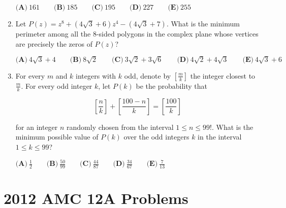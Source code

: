 \documentclass{article}
\begin{document}
\begin{enumerate}[label=\arabic*., itemsep=0.5em]
\(\textbf{(A)}\ 161 \qquad \textbf{(B)}\ 185 \qquad \textbf{(C)}\  195 \qquad \textbf{(D)}\  227 \qquad \textbf{(E)}\  255\)\par \vspace{0.5em}\item Let \(P(z) = z^8 + \left(4\sqrt{3} + 6\right)z^4 - \left(4\sqrt{3} + 7\right)\). What is the minimum perimeter among all the \(8\)-sided polygons in the complex plane whose vertices are precisely the zeros of \(P(z)\)?

\(\textbf{(A)}\ 4\sqrt{3} + 4 \qquad \textbf{(B)}\ 8\sqrt{2} \qquad \textbf{(C)}\  3\sqrt{2} + 3\sqrt{6} \qquad \textbf{(D)}\  4\sqrt{2} + 4\sqrt{3} \qquad \textbf{(E)}\  4\sqrt{3} + 6\)\par \vspace{0.5em}\item For every \(m\) and \(k\) integers with \(k\) odd, denote by \(\left[\frac{m}{k}\right]\) the integer closest to \(\frac{m}{k}\). For every odd integer \(k\), let \(P(k)\) be the probability that


\begin{equation*}
\left[\frac{n}{k}\right] + \left[\frac{100 - n}{k}\right] = \left[\frac{100}{k}\right]
\end{equation*}


for an integer \(n\) randomly chosen from the interval \(1 \leq n \leq 99!\). What is the minimum possible value of \(P(k)\) over the odd integers \(k\) in the interval \(1 \leq k \leq 99\)?

\(\textbf{(A)}\ \frac{1}{2} \qquad \textbf{(B)}\ \frac{50}{99} \qquad \textbf{(C)}\ \frac{44}{87} \qquad \textbf{(D)}\  \frac{34}{67} \qquad \textbf{(E)}\  \frac{7}{13}\)\par \vspace{0.5em}
\end{enumerate}
\newpage\section*{2012 AMC 12A Problems}
\end{document}
